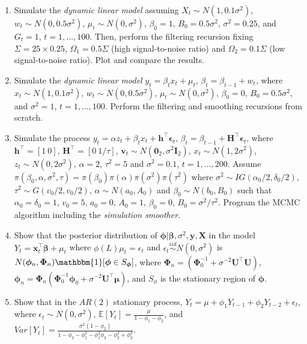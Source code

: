 \begin{enumerate}
	\item Simulate the \textit{dynamic linear model} assuming $X_t\sim N(1, 0.1\sigma^2)$, $w_t\sim N(0, 0.5\sigma^2)$, $\mu_t\sim N(0, \sigma^2)$, $\beta_0=1$, ${B}_0=0.5\sigma^2$, $\sigma^2=0.25$, and ${G}_t=1$, $t=1,\dots,100$. Then, perform the filtering recursion fixing $\Sigma=25\times 0.25$, $\Omega_1=0.5\Sigma$ (high signal-to-noise ratio) and  $\Omega_2=0.1\Sigma$ (low signal-to-noise ratio). Plot and compare the results. 	
	
	\item Simulate the \textit{dynamic linear model} $y_t=\beta_t x_t + \mu_t$, $\beta_t=\beta_{t-1}+w_t$, where $x_t\sim N(1, 0.1\sigma^2)$, $w_t\sim N(0, 0.5\sigma^2)$, $\mu_t\sim N(0, \sigma^2)$, $\beta_0=0$, $B_0=0.5\sigma^2$, and $\sigma^2=1$, $t=1,\dots,100$. Perform the filtering and smoothing recursions from scratch. 	
	
	\item Simulate the process $y_t=\alpha z_t + \beta_t x_t + \bm{h}^{\top}\bm{\epsilon}_t$, $\beta_t=\beta_{t-1}+\bm{H}^{\top}\bm{\epsilon}_t$, where $\bm{h}^{\top}=[1 \ 0]$, $\bm{H}^{\top}=[0 \ 1/\tau]$, $\bm{v}_t\sim N(\bm{0}_2, \sigma^2\bm{I}_2)$, $x_t\sim N(1, 2\sigma^2)$, $z_t\sim N(0, 2\sigma^2)$, $\alpha=2$, $\tau^2=5$ and $\sigma^2=0.1$, $t=1,\dots,200$. Assume $\pi({\beta}_0,{\alpha},\sigma^2,{\tau})=\pi({\beta}_0)\pi({\alpha})\pi(\sigma^2)\pi(\tau^2)$ where $\sigma^2\sim IG(\alpha_0/2,\delta_0/2)$, $\tau^2\sim G(v_{0}/2,v_{0}/2)$, ${\alpha}\sim N({a}_0,{A}_0)$ and ${\beta}_0\sim N({b}_0,{B}_0)$ such that $\alpha_0=\delta_0=1$, $v_0=5$, $a_0=0$, $A_0=1$, $\beta_0=0$, $B_0=\sigma^2/\tau^2$. Program the MCMC algorithm including the \textit{simulation smoother}.
	
	\item Show that the posterior distribution of $\bm{\phi}|\bm{\beta},\sigma^2,\bm{y},\bm{X}$ in the model $Y_t=\bm{x}_t^{\top}\bm{\beta}+\mu_t$ where $\phi(L)\mu_t=\epsilon_t$ and $\epsilon_t\stackrel{iid}{\sim}N(0,\sigma^2)$ is $N(\bm{\phi}_n, \bm{\Phi}_n)\mathbbm{1}[\bm{\phi}\in S_{\bm{\phi}}]$, where $\bm{\Phi}_n=(\bm{\Phi}_0^{-1}+\sigma^{-2}\bm{U}^{\top}\bm{U})$, $\bm{\phi}_n=\bm{\Phi}_n(\bm{\Phi}_0^{-1}\bm{\phi}_0+\sigma^{-2}\bm{U}^{\top}\bm{\mu})$, and $S_{\phi}$ is the stationary region of $\bm{\phi}$.	  
	
	\item Show that in the $AR(2)$ stationary process, $Y_t=\mu+\phi_1Y_{t-1}+\phi_2Y_{t-2}+\epsilon_t$, where $\epsilon_t\sim N(0,\sigma^2)$, $\mathbb{E}[Y_t]=\frac{\mu}{1-\phi_1-\phi_2}$, and $Var[Y_t]=\frac{\sigma^2(1-\phi_2)}{1-\phi_2-\phi_1^2-\phi_1^2\phi_2-\phi_2^2+\phi_2^3}$.
	
	
\end{enumerate}
